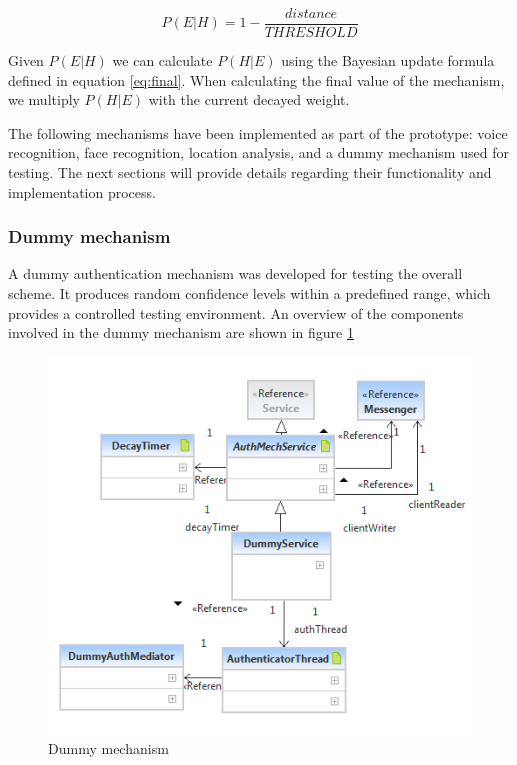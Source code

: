 \begin{equation} 
\label{eq:euclideantoprob}
P(E|H) = 1 - \frac{distance}{THRESHOLD}
\end{equation}

Given $P(E|H)$ we can calculate $P(H|E)$ using the Bayesian update formula defined in equation \ref{eq:final}. When calculating the final value of the mechanism, we multiply $P(H|E)$ with the current decayed weight.

The following mechanisms have been implemented as part of the prototype: voice recognition, face recognition, location analysis, and a dummy mechanism used for testing. The next sections will provide details regarding their functionality and implementation process.

\subsubsection{Dummy mechanism}
A dummy authentication mechanism was developed for testing the overall scheme. It produces random confidence levels within a predefined range, which provides a controlled testing environment. An overview of the components involved in the dummy mechanism are shown in figure \ref{fig:dummy}
\begin{figure}[h]
    \centering
    \includegraphics[width=\textwidth]{Pictures/dummy-brief}
    \caption{Dummy mechanism}
    \label{fig:dummy}
\end{figure}

